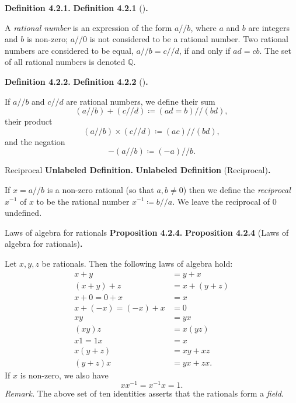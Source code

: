 \documentclass[12pt]{article}
\newenvironment{df}[2][\relax]{
\vspace{4mm}
    \noindent\setlength{\parskip}{1em}%
    \ifx#1\relax%
        \textbf{#2. }%
    \else%
        \textbf{#2} (#1)\textbf{. }%
    \fi%
    \ignorespaces%
}{}
\theoremstyle{remark}
\begin{document}
\begin{df}{Definition 4.2.1}
    A \emph{rational number} is an expression of the form $a // b$, where $a$ and $b$ are integers and $b$ is non-zero; $a // 0$ is not considered to be a rational number.
    Two rational numbers are considered to be equal, $a // b = c // d$, if and only if $ad = cb$.
    The set of all rational numbers is denoted $\mathbb{Q}$.
\end{df}


\begin{df}{Definition 4.2.2}
    If $a // b$ and $c // d$ are rational numbers, we define their sum
    \[
        (a // b) + (c // d) \coloneqq (ad = b) // (bd),
    \]
    their product
    \[
        (a // b) \times (c // d) \coloneqq (ac) // (bd),
    \]
    and the negation
    {\setlength{\belowdisplayskip}{-10pt} \setlength{\belowdisplayshortskip}{-10pt}
    \[
        -(a // b) \coloneqq (-a) // b.
    \]
    }
\end{df}


\begin{df}[Reciprocal]{Unlabeled Definition}
    If $x = a//b$ is a non-zero rational (so that $a, b \ne 0$) then we define the \emph{reciprocal} $x^{-1}$ of $x$ to be the rational number $x^{-1} \coloneqq b // a$.
    We leave the reciprocal of $0$ undefined.
\end{df}


\begin{df}[Laws of algebra for rationals]{Proposition 4.2.4}
    Let $x, y, z$ be rationals.
    Then the following laws of algebra hold:
    {\setlength{\abovedisplayskip}{0pt}
    \begin{align*}%
        x + y &= y + x \\
        (x + y) + z &= x + (y + z) \\
        x + 0 = 0 + x &= x \\
        x + (-x) = (-x) + x &= 0 \\
        xy &= yx \\
        (xy)z &= x(yz) \\
        x1 = 1x &= x \\
        x(y + z) &= xy + xz \\
        (y + z)x &= yx + zx.%
    \end{align*}%
    }%
    If $x$ is non-zero, we also have
    \[
        xx^{-1} = x^{-1}x = 1.
    \]
    \textit{Remark. } The above set of ten identities asserts that the rationals form a \emph{field}.
\end{df}
\end{document}
